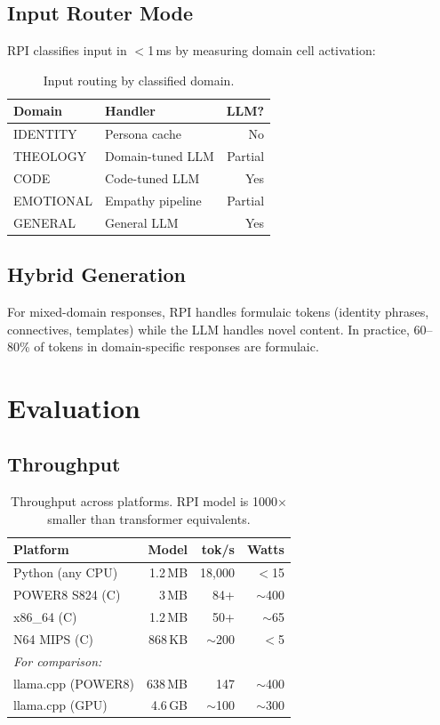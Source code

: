 \documentclass[10pt,twocolumn]{article}
\begin{document}
\subsection{Input Router Mode}

RPI classifies input in $<$1\,ms by measuring domain cell activation:

\begin{table}[h]
\centering
\small
\begin{tabular}{llr}
\toprule
\textbf{Domain} & \textbf{Handler} & \textbf{LLM?} \\
\midrule
IDENTITY & Persona cache & No \\
THEOLOGY & Domain-tuned LLM & Partial \\
CODE & Code-tuned LLM & Yes \\
EMOTIONAL & Empathy pipeline & Partial \\
GENERAL & General LLM & Yes \\
\bottomrule
\end{tabular}
\caption{Input routing by classified domain.}
\label{tab:routing}
\end{table}

\subsection{Hybrid Generation}

For mixed-domain responses, RPI handles formulaic tokens (identity phrases, connectives, templates) while the LLM handles novel content. In practice, 60--80\% of tokens in domain-specific responses are formulaic.

\section{Evaluation}
\label{sec:eval}

\subsection{Throughput}

\begin{table}[h]
\centering
\small
\begin{tabular}{lrrr}
\toprule
\textbf{Platform} & \textbf{Model} & \textbf{tok/s} & \textbf{Watts} \\
\midrule
Python (any CPU) & 1.2\,MB & 18,000 & $<$15 \\
POWER8 S824 (C) & 3\,MB & 84+ & $\sim$400 \\
x86\_64 (C) & 1.2\,MB & 50+ & $\sim$65 \\
N64 MIPS (C) & 868\,KB & $\sim$200 & $<$5 \\
\midrule
\multicolumn{4}{l}{\emph{For comparison:}} \\
llama.cpp (POWER8) & 638\,MB & 147 & $\sim$400 \\
llama.cpp (GPU) & 4.6\,GB & $\sim$100 & $\sim$300 \\
\bottomrule
\end{tabular}
\caption{Throughput across platforms. RPI model is 1000$\times$ smaller than transformer equivalents.}
\label{tab:throughput}
\end{table}
\end{document}
